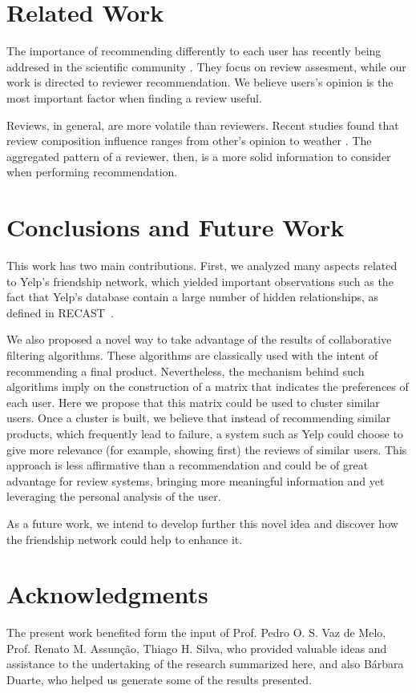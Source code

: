 \documentclass[12pt]{article}
\begin{document}
\section{Related Work}
The importance of recommending differently to each user has recently being
addresed in the scientific community \cite{qualiPred, helpPred}. They focus on
review assesment, while our work is directed to reviewer recommendation. We
believe users's opinion is the most important factor when finding a review
useful.

Reviews, in general, are more volatile than reviewers. Recent studies found that
review composition influence ranges from other's opinion to weather \cite{demog,
wasHelp}. The aggregated pattern of a reviewer, then, is a more solid
information to consider when performing recommendation.


\section{Conclusions and Future Work}

This work has two main contributions. First, we analyzed many aspects related to Yelp's friendship network, which yielded important observations such as the fact that Yelp's database contain a large number of hidden relationships, as defined in RECAST~\cite{vaz2013recast}.


We also proposed a novel way to take advantage of the results of collaborative filtering algorithms. These algorithms are classically used with the intent of recommending a final product. Nevertheless, the mechanism behind such algorithms imply on the construction of a matrix that indicates the preferences of each user. Here we propose that this matrix could be used to cluster similar users. Once a cluster is built, we believe that instead of recommending similar products, which frequently lead to failure, a system such as Yelp could choose to give more relevance (for example, showing first) the reviews of similar users. This approach is less affirmative than a recommendation and could be of great advantage for review systems, bringing more meaningful information and yet leveraging the personal analysis of the user.

As a future work, we intend to develop further this novel idea and discover how the friendship network could help to enhance it.

\section{Acknowledgments}

The present work benefited form the input of Prof. Pedro O. S. Vaz de Melo, Prof. Renato M. Assun\c{c}\~{a}o, Thiago H. Silva, who provided valuable ideas and assistance to the undertaking of the research summarized here, and also B\'{a}rbara Duarte, who helped us generate some of the results presented.




\renewcommand\refname{References}

\end{document}
